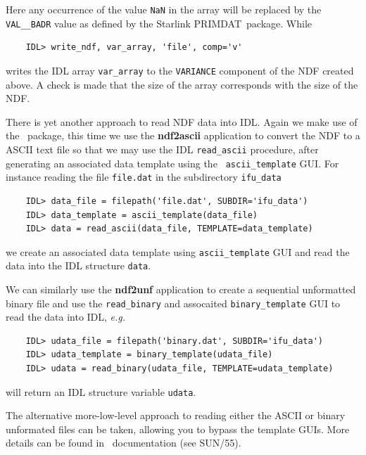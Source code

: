 \documentclass[twoside,11pt]{article}
\newcommand{\xref}[3]{#1}
\begin{document}
Here any occurrence of the value {\tt NaN} in the array will be
replaced by the {\tt VAL\_\_BADR} value as defined by the Starlink
{\footnotesize PRIMDAT}\normalsize\ package.  While

\small\begin{verbatim}
    IDL> write_ndf, var_array, 'file', comp='v'
\end{verbatim}\normalsize    
 
writes the IDL array {\tt var\_array} to the {\tt VARIANCE} component
of the NDF created above.  A check is made that the size of the array
corresponds with the size of the NDF. 

There is yet another approach to read NDF data into IDL.  Again we
make use of the \CONVERT\ package, this time we use the \xref{{\bf
ndf2ascii}}{sun55}{NDF2ASCII} application to convert the NDF to a
ASCII text file so that we may use the IDL {\tt read\_ascii}
procedure, after generating an associated data template using the {\tt
ascii\_template} GUI.  For instance reading the file {\tt file.dat} in
the subdirectory {\tt ifu\_data}

\small\begin{verbatim}
    IDL> data_file = filepath('file.dat', SUBDIR='ifu_data')
    IDL> data_template = ascii_template(data_file)
    IDL> data = read_ascii(data_file, TEMPLATE=data_template)
\end{verbatim}\normalsize 

we create an associated data template using {\tt ascii\_template} GUI
and read the data into the IDL structure {\tt data}.

We can similarly use the \xref{{\bf ndf2unf}}{sun55}{NDF2UNF}
application to create a sequential unformatted binary file and use the
{\tt read\_binary} and assocaited {\tt binary\_template} GUI to read
the data into IDL, \emph{e.g.}

\small\begin{verbatim}
    IDL> udata_file = filepath('binary.dat', SUBDIR='ifu_data')
    IDL> udata_template = binary_template(udata_file)
    IDL> udata = read_binary(udata_file, TEMPLATE=udata_template)
\end{verbatim}\normalsize 

will return an IDL structure variable {\tt udata}.

The alternative more-low-level approach to reading either the ASCII or
binary unformated files can be taken, allowing you to bypass the
template GUIs.  More details can be found in \CONVERT\ documentation (see
\xref{SUN/55}{sun55}{}).
\end{document}
